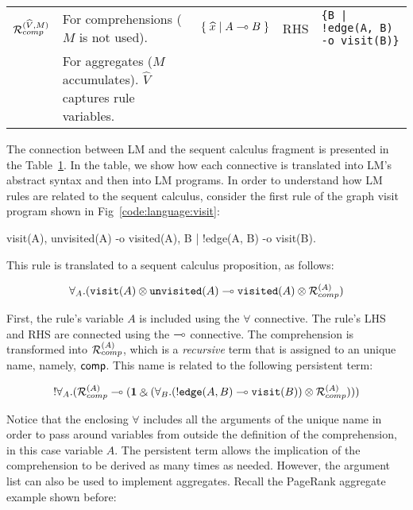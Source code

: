 \begin{table*}
\begin{center}
{\begin{tabular}{ | l | l || l | l | l |}
                                 $\mathcal{R}_{comp}^{(\widehat{V}, M)}$               & For comprehensions
    ($M$ is not used).  & $\{ \; \widehat{x} \; | \; A \multimap B \; \}$  & RHS & \texttt{\{B | !edge(A, B) -o visit(B)\}}        \\
    & For aggregates ($M$ accumulates). $\widehat{V}$ captures rule variables.          &                                               &                 &                                                \\ \hline
    \end{tabular}
}
\end{center}
\label{table:linear}
\end{table*}

The connection between LM and the sequent calculus fragment is presented in the
Table~\ref{table:linear}. In the table, we show how each connective is
translated into LM's abstract syntax and then into LM programs. In order to
understand how LM rules are related to the sequent calculus, consider the first
rule of the graph visit program shown in Fig~\ref{code:language:visit}:

\begin{LineCode}[commandchars=\*\[\]]
visit(A),
unvisited(A)
   -o visited(A),
      {B | !edge(A, B) -o visit(B)}.
\end{LineCode}

This rule is translated to a sequent calculus proposition, as follows:

\begin{align}
\forall_A. (\texttt{visit}(A) \otimes \texttt{unvisited}(A) \multimap
   \texttt{visited}(A) \otimes \mathcal{R}_{comp}^{(A)})
\end{align}

First, the rule's variable $A$ is included using the $\forall$ connective. The
rule's LHS and RHS are connected using the $\multimap$ connective. The
comprehension is transformed into $\mathcal{R}_{comp}^{(A)}$, which is a
\emph{recursive} term that is assigned to an unique name, namely, $\mathsf{comp}$.
This name is related to the following persistent term:

\begin{align}
{!} \forall_A. (\mathcal{R}_{comp}^{(A)} \multimap (\mathbf{1} \mathbin{\binampersand}
         (\forall_B. ({!} \texttt{edge}(A, B) \multimap
                                             \texttt{visit}(B)) \otimes
          \mathcal{R}_{comp}^{(A)})))
\end{align}

Notice that the enclosing $\forall$ includes all the arguments of the unique
name in order to pass around variables from outside the definition of the
comprehension, in this case variable $A$. The persistent term allows the
implication of the comprehension to be derived as many times as needed.
However, the argument list can also be used to implement aggregates.  Recall the
PageRank aggregate example shown before:


